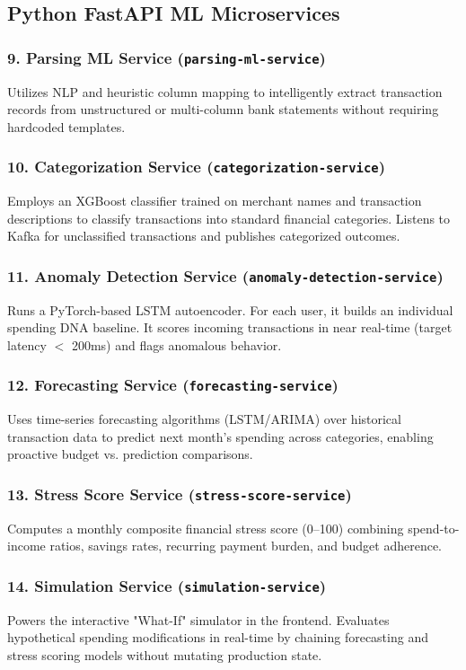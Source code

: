 \documentclass[12pt,a4paper]{report}
\begin{document}
\subsection{Python FastAPI ML Microservices}

\subsubsection{9. Parsing ML Service (\texttt{parsing-ml-service})}
Utilizes NLP and heuristic column mapping to intelligently extract transaction records from unstructured or multi-column bank statements without requiring hardcoded templates.

\subsubsection{10. Categorization Service (\texttt{categorization-service})}
Employs an XGBoost classifier trained on merchant names and transaction descriptions to classify transactions into standard financial categories. Listens to Kafka for unclassified transactions and publishes categorized outcomes.

\subsubsection{11. Anomaly Detection Service (\texttt{anomaly-detection-service})}
Runs a PyTorch-based LSTM autoencoder. For each user, it builds an individual spending DNA baseline. It scores incoming transactions in near real-time (target latency $<$ 200ms) and flags anomalous behavior.

\subsubsection{12. Forecasting Service (\texttt{forecasting-service})}
Uses time-series forecasting algorithms (LSTM/ARIMA) over historical transaction data to predict next month's spending across categories, enabling proactive budget vs. prediction comparisons.

\subsubsection{13. Stress Score Service (\texttt{stress-score-service})}
Computes a monthly composite financial stress score (0--100) combining spend-to-income ratios, savings rates, recurring payment burden, and budget adherence.

\subsubsection{14. Simulation Service (\texttt{simulation-service})}
Powers the interactive "What-If" simulator in the frontend. Evaluates hypothetical spending modifications in real-time by chaining forecasting and stress scoring models without mutating production state.
\end{document}
